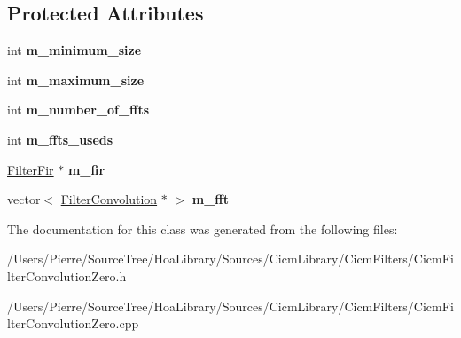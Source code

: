 \subsection*{Protected Attributes}
\begin{DoxyCompactItemize}
\item 
\hypertarget{class_filter_convolution_zero_a8db018405cb92c917d02f20d45b2dd65}{int {\bfseries m\-\_\-minimum\-\_\-size}}\label{class_filter_convolution_zero_a8db018405cb92c917d02f20d45b2dd65}

\item 
\hypertarget{class_filter_convolution_zero_add9e349da32a20fd6186edb0e28b92fc}{int {\bfseries m\-\_\-maximum\-\_\-size}}\label{class_filter_convolution_zero_add9e349da32a20fd6186edb0e28b92fc}

\item 
\hypertarget{class_filter_convolution_zero_a9069f23a84d1c2f46f2c640e5be61897}{int {\bfseries m\-\_\-number\-\_\-of\-\_\-ffts}}\label{class_filter_convolution_zero_a9069f23a84d1c2f46f2c640e5be61897}

\item 
\hypertarget{class_filter_convolution_zero_a4e6d5c985380124f57b86ab70bbe509c}{int {\bfseries m\-\_\-ffts\-\_\-useds}}\label{class_filter_convolution_zero_a4e6d5c985380124f57b86ab70bbe509c}

\item 
\hypertarget{class_filter_convolution_zero_a201baa7ff84ae7b09df236627de03448}{\hyperlink{class_filter_fir}{Filter\-Fir} $\ast$ {\bfseries m\-\_\-fir}}\label{class_filter_convolution_zero_a201baa7ff84ae7b09df236627de03448}

\item 
\hypertarget{class_filter_convolution_zero_a03a3c81b87a781da55a97dd40aacdd68}{vector$<$ \hyperlink{class_filter_convolution}{Filter\-Convolution} $\ast$ $>$ {\bfseries m\-\_\-fft}}\label{class_filter_convolution_zero_a03a3c81b87a781da55a97dd40aacdd68}

\end{DoxyCompactItemize}


The documentation for this class was generated from the following files\-:\begin{DoxyCompactItemize}
\item 
/\-Users/\-Pierre/\-Source\-Tree/\-Hoa\-Library/\-Sources/\-Cicm\-Library/\-Cicm\-Filters/Cicm\-Filter\-Convolution\-Zero.\-h\item 
/\-Users/\-Pierre/\-Source\-Tree/\-Hoa\-Library/\-Sources/\-Cicm\-Library/\-Cicm\-Filters/Cicm\-Filter\-Convolution\-Zero.\-cpp\end{DoxyCompactItemize}

